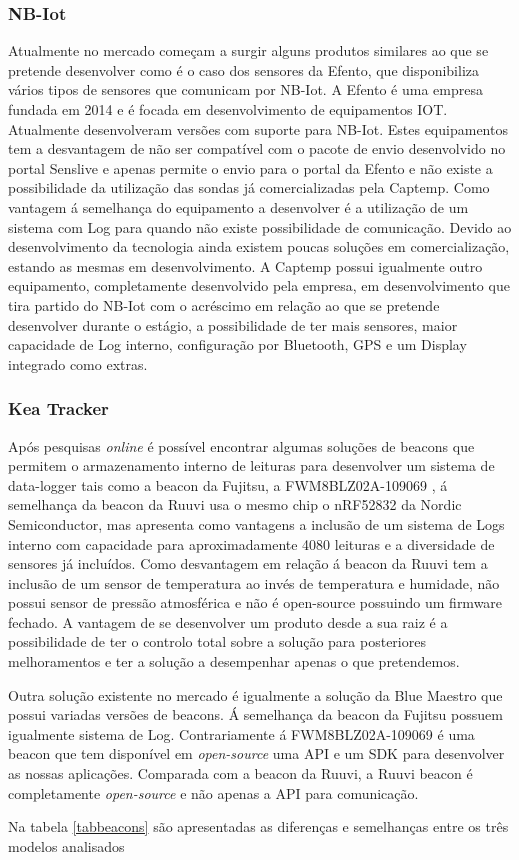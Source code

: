 \subsubsection{NB-Iot}
\par
Atualmente no mercado começam a surgir alguns produtos similares ao que se pretende desenvolver como é o caso dos sensores da Efento\cite{epoka}, que disponibiliza vários tipos de sensores que comunicam por NB-Iot. A Efento é uma empresa fundada em 2014 e é focada em desenvolvimento de equipamentos IOT. Atualmente desenvolveram versões com suporte para NB-Iot. Estes equipamentos tem a desvantagem de não ser compatível com o pacote de envio desenvolvido no portal Senslive e apenas permite o envio para o portal da Efento e não existe a possibilidade da utilização das sondas já comercializadas pela Captemp. Como vantagem á semelhança do equipamento a desenvolver é a utilização de um sistema com Log para quando não existe possibilidade de comunicação.
Devido ao desenvolvimento da tecnologia ainda existem poucas soluções em comercialização, estando as mesmas em desenvolvimento. A Captemp possui igualmente outro equipamento, completamente desenvolvido pela empresa, em desenvolvimento que tira partido do NB-Iot com o acréscimo em relação ao que se pretende desenvolver durante o estágio, a possibilidade de ter mais sensores, maior capacidade de Log interno, configuração por Bluetooth, GPS e um Display integrado como extras.


\subsubsection{Kea Tracker}
Após pesquisas \textit{online} é possível encontrar algumas soluções de beacons que permitem o armazenamento interno de leituras para desenvolver um sistema de data-logger tais como a beacon da Fujitsu, a FWM8BLZ02A-109069\cite{beacon1} , á semelhança da beacon da Ruuvi usa o mesmo chip o nRF52832 da Nordic Semiconductor, mas apresenta como vantagens a inclusão de um sistema de Logs interno com capacidade para aproximadamente 4080 leituras e a diversidade de sensores já incluídos. Como desvantagem em relação á beacon da Ruuvi tem a inclusão de um sensor de temperatura ao invés de temperatura e humidade, não possui sensor de pressão atmosférica e não é open-source possuindo um firmware fechado. A vantagem de se desenvolver um produto desde a sua raiz é a possibilidade de ter o controlo total sobre a solução para posteriores melhoramentos e ter a solução a desempenhar apenas o que pretendemos.
\par
Outra solução existente no mercado é igualmente a solução da Blue Maestro que possui variadas versões de beacons. Á semelhança da beacon da Fujitsu possuem igualmente sistema de Log. Contrariamente á FWM8BLZ02A-109069 é uma beacon que tem disponível em \textit{open-source} uma API e um SDK para desenvolver as nossas aplicações. Comparada com a beacon da Ruuvi, a Ruuvi beacon é completamente \textit{open-source} e não apenas a API para comunicação.
\par
Na tabela \ref{tabbeacons} são apresentadas as diferenças e semelhanças entre os três modelos analisados

